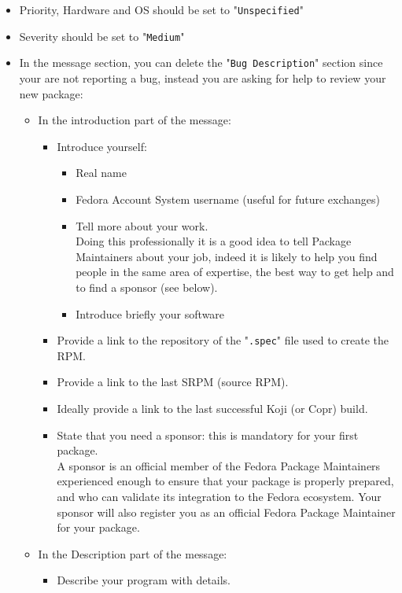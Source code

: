 \begin{enumerate}
\begin{itemize}
\begin{itemize}
\end{itemize}
\item Priority, Hardware and OS should be set to "\texttt{Unspecified}" 
\item Severity should be set to "\texttt{Medium}"
\item In the message section, you can delete the "\texttt{Bug Description}" section since your are not reporting a bug, instead you are asking for help to review your new package: 
\begin{itemize}
\item In the introduction part of the message: 
\begin{itemize}
\item Introduce yourself:
\begin{itemize}
\item Real name
\item Fedora Account System username (useful for future exchanges)
\item Tell more about your work. \\[0.25cm]
Doing this professionally it is a good idea to tell Package Maintainers about your job,
indeed it is likely to help you find people in the same area of expertise, the best way to get help and to find a sponsor (see below). \\[-0.25cm] 
\item Introduce briefly your software\\[-0.25cm]
\end{itemize}
\item Provide a link to the repository of the "\texttt{.spec}" file used to create the RPM. 
\item Provide a link to the last SRPM (source RPM).
\item Ideally provide a link to the last successful Koji (or Copr) build. 
\item State that you need a sponsor: this is mandatory for your first package. \\[0.25cm]
A sponsor is an official member of the Fedora Package Maintainers experienced enough to ensure that your package 
is properly prepared, and who can validate its integration to the Fedora ecosystem. 
Your sponsor will also register you as an official Fedora Package Maintainer for your package. \\
\end{itemize}
\item In the Description part of the message:
\begin{itemize}
\item Describe your program with details. 

\end{itemize}
\end{itemize}
\end{itemize}
\end{enumerate}
